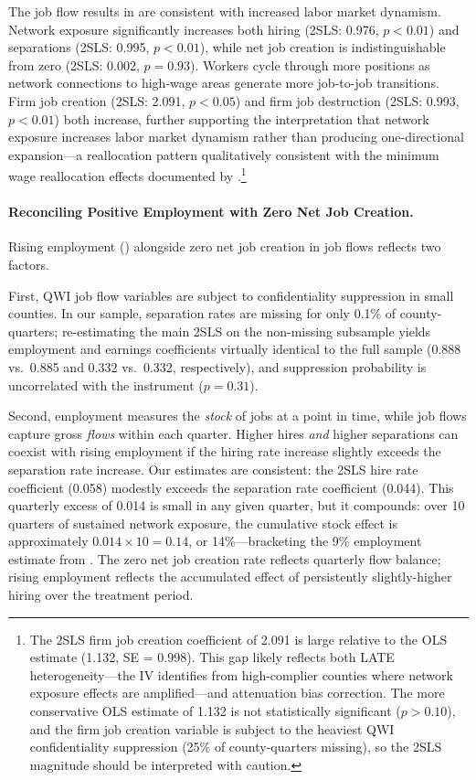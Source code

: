 \documentclass[12pt]{article}
\begin{document}
The job flow results in  are consistent with increased labor market dynamism. Network exposure significantly increases both hiring (2SLS: 0.976, $p < 0.01$) and separations (2SLS: 0.995, $p < 0.01$), while net job creation is indistinguishable from zero (2SLS: 0.002, $p = 0.93$). Workers cycle through more positions as network connections to high-wage areas generate more job-to-job transitions. Firm job creation (2SLS: 2.091, $p < 0.05$) and firm job destruction (2SLS: 0.993, $p < 0.01$) both increase, further supporting the interpretation that network exposure increases labor market dynamism rather than producing one-directional expansion---a reallocation pattern qualitatively consistent with the minimum wage reallocation effects documented by \citet{dustmann2022}.\footnote{The 2SLS firm job creation coefficient of 2.091 is large relative to the OLS estimate (1.132, SE = 0.998). This gap likely reflects both LATE heterogeneity---the IV identifies from high-complier counties where network exposure effects are amplified---and attenuation bias correction. The more conservative OLS estimate of 1.132 is not statistically significant ($p > 0.10$), and the firm job creation variable is subject to the heaviest QWI confidentiality suppression (25\% of county-quarters missing), so the 2SLS magnitude should be interpreted with caution.}

\paragraph{Reconciling Positive Employment with Zero Net Job Creation.} Rising employment () alongside zero net job creation in job flows reflects two factors.

First, QWI job flow variables are subject to confidentiality suppression in small counties. In our sample, separation rates are missing for only 0.1\% of county-quarters; re-estimating the main 2SLS on the non-missing subsample yields employment and earnings coefficients virtually identical to the full sample (0.888 vs.\ 0.885 and 0.332 vs.\ 0.332, respectively), and suppression probability is uncorrelated with the instrument ($p = 0.31$).

Second, employment measures the \textit{stock} of jobs at a point in time, while job flows capture gross \textit{flows} within each quarter. Higher hires \textit{and} higher separations can coexist with rising employment if the hiring rate increase slightly exceeds the separation rate increase. Our estimates are consistent: the 2SLS hire rate coefficient (0.058) modestly exceeds the separation rate coefficient (0.044). This quarterly excess of 0.014 is small in any given quarter, but it compounds: over 10 quarters of sustained network exposure, the cumulative stock effect is approximately $0.014 \times 10 = 0.14$, or 14\%---bracketing the 9\% employment estimate from . The zero net job creation rate reflects quarterly flow balance; rising employment reflects the accumulated effect of persistently slightly-higher hiring over the treatment period.
\end{document}
